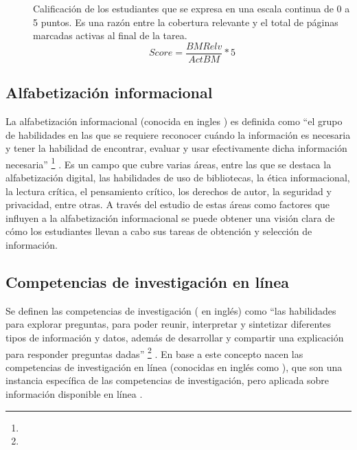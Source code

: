 \begin{description}
	\item [] Calificación de los estudiantes que se expresa en una escala continua de 0 a 5 puntos. Es una razón entre la cobertura relevante y el total de páginas marcadas activas al final de la tarea. 
	\begin{equation}
	Score = \frac{BMRelv}{ActBM} * 5
	\end{equation}

\end{description}

\subsection{Alfabetización informacional}
\label{subsec:alfabetizacion}
La alfabetización informacional (conocida en ingles ) es definida como “el grupo de habilidades en las que se requiere reconocer cuándo la información es necesaria y tener la habilidad de encontrar, evaluar y usar efectivamente dicha información necesaria” \footnote{\traduccionlibre} \parencite[p.~2]{american2000information}. Es un campo que cubre varias áreas, entre las que se destaca la alfabetización digital, las habilidades de uso de bibliotecas, la ética informacional, la lectura crítica, el pensamiento crítico, los derechos de autor, la seguridad y privacidad, entre otras. A través del estudio de estas áreas como factores que influyen a la alfabetización informacional se puede obtener una visión clara de cómo los estudiantes llevan a cabo sus tareas de obtención y selección de información.

\subsection{Competencias de investigación en línea}
\label{subsec:competencias}
Se definen las competencias de investigación ( en inglés) como “las habilidades para explorar preguntas, para poder reunir, interpretar y sintetizar diferentes tipos de información y datos, además de desarrollar y compartir una explicación para responder preguntas dadas” \footnote{\traduccionlibre} \parencite[p.~13]{national2000inquiry}. En base a este concepto nacen las competencias de investigación en línea (conocidas en inglés como ), que son una instancia específica de las competencias de investigación, pero aplicada sobre información disponible en línea \parencite{quintana2005framework}.

